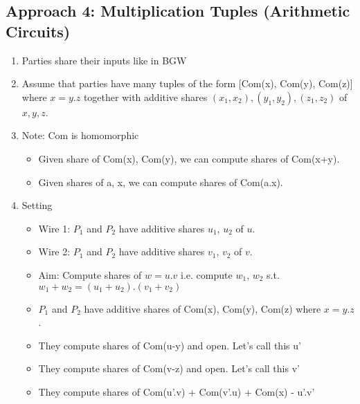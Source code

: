 \subsection{Approach 4: Multiplication Tuples (Arithmetic Circuits)}
\begin{enumerate}
    \item Parties share their inputs like in BGW
    \item Assume that parties have many tuples of the form [Com(x), Com(y), Com(z)] where $x = y.z$ together with additive shares $(x_1, x_2), (y_1, y_2), (z_1, z_2)$ of $x, y, z$. 
    \item Note: Com is homomorphic
    \begin{itemize}
        \item Given share of Com(x), Com(y), we can compute shares of Com(x+y).
        \item Given shares of a, x, we can compute shares of Com(a.x). 
    \end{itemize}
    \item Setting 
    \begin{itemize}
        \item Wire 1: $P_1$ and $P_2$ have additive shares $u_1$, $u_2$ of $u$.
        \item Wire 2: $P_1$ and $P_2$ have additive shares $v_1$, $v_2$ of $v$.
        \item Aim: Compute shares of $w=u.v$ i.e. compute $w_1$, $w_2$ s.t. $w_1 + w_2 = (u_1 + u_2).(v_1 + v_2)$
        \item $P_1$ and $P_2$ have additive shares of Com(x), Com(y), Com(z) where $x =y.z$.
        \item They compute shares of Com(u-y) and open. Let's call this u'
        \item They compute shares of Com(v-z) and open. Let's call this v'
        \item They compute shares of Com(u'.v) + Com(v'.u) + Com(x) - u'.v'
    \end{itemize}
\end{enumerate}

